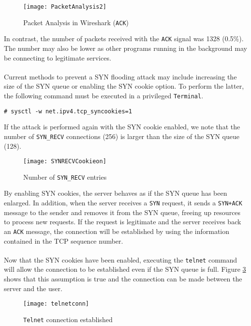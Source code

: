 \documentclass[a4paper,12pt]{article}
\begin{document}
\begin{figure}[H]
	\centering
	\texttt{[image: PacketAnalysis2]}
	\caption{Packet Analysis in Wireshark (\texttt{ACK})}
	\label{fig:packetanalysis2}
\end{figure}
\noindent In contrast, the number of packets received with the \texttt{ACK} signal was 1328 (0.5\%). The number may also be lower as other programs running in the background may be connecting to legitimate services.
\\\\Current methods to prevent a SYN flooding attack may include increasing the size of the SYN queue or enabling the SYN cookie option. To perform the latter, the following command must be executed in a privileged \texttt{Terminal}.
\begin{verbatim}
# sysctl -w net.ipv4.tcp_syncookies=1
\end{verbatim}
If the attack is performed again with the SYN cookie enabled, we note that the number of \texttt{SYN\_RECV} connections (256) is larger than the size of the SYN queue (128).
\begin{figure}[H]
	\centering
	\texttt{[image: SYNRECVCookieon]}
	\caption{Number of \texttt{SYN\_RECV} entries}
	\label{fig:synrecvcookieon}
\end{figure}
\noindent By enabling SYN cookies, the server behaves as if the SYN queue has been enlarged. In addition, when the server receives a \texttt{SYN} request, it sends a \texttt{SYN+ACK} message to the sender and removes it from the SYN queue, freeing up resources to process new requests. If the request is legitimate and the server receives back an \texttt{ACK} message, the connection will be established by using the information contained in the TCP sequence number.\\\\Now that the SYN cookies have been enabled, executing the \texttt{telnet} command will allow the connection to be established even if the SYN queue is full. Figure \ref{fig:telnetconn} shows that this assumption is true and the connection can be made between the server and the user.
\begin{figure}[H]
	\centering
	\texttt{[image: telnetconn]}
	\caption{\texttt{Telnet} connection established}
	\label{fig:telnetconn}
\end{figure}
\end{document}
